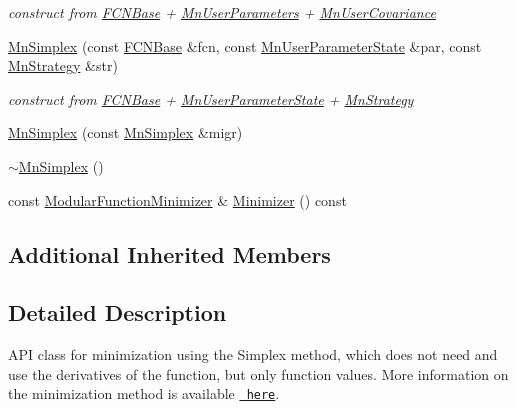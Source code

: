 \begin{DoxyCompactItemize}
\begin{DoxyCompactList}\small\item\em construct from \mbox{\hyperlink{classROOT_1_1Minuit2_1_1FCNBase}{F\+C\+N\+Base}} + \mbox{\hyperlink{classROOT_1_1Minuit2_1_1MnUserParameters}{Mn\+User\+Parameters}} + \mbox{\hyperlink{classROOT_1_1Minuit2_1_1MnUserCovariance}{Mn\+User\+Covariance}} \end{DoxyCompactList}\item 
\mbox{\hyperlink{classROOT_1_1Minuit2_1_1MnSimplex_a3dc51e6d9719501f7fce44a66444c6d2}{Mn\+Simplex}} (const \mbox{\hyperlink{classROOT_1_1Minuit2_1_1FCNBase}{F\+C\+N\+Base}} \&fcn, const \mbox{\hyperlink{classROOT_1_1Minuit2_1_1MnUserParameterState}{Mn\+User\+Parameter\+State}} \&par, const \mbox{\hyperlink{classROOT_1_1Minuit2_1_1MnStrategy}{Mn\+Strategy}} \&str)
\begin{DoxyCompactList}\small\item\em construct from \mbox{\hyperlink{classROOT_1_1Minuit2_1_1FCNBase}{F\+C\+N\+Base}} + \mbox{\hyperlink{classROOT_1_1Minuit2_1_1MnUserParameterState}{Mn\+User\+Parameter\+State}} + \mbox{\hyperlink{classROOT_1_1Minuit2_1_1MnStrategy}{Mn\+Strategy}} \end{DoxyCompactList}\item 
\mbox{\hyperlink{classROOT_1_1Minuit2_1_1MnSimplex_a47aec4c766dc559a1a1e1fe7809d0a88}{Mn\+Simplex}} (const \mbox{\hyperlink{classROOT_1_1Minuit2_1_1MnSimplex}{Mn\+Simplex}} \&migr)
\item 
\mbox{\hyperlink{classROOT_1_1Minuit2_1_1MnSimplex_a0cab2c1cf29e82fdd340eb78e0cd7ff2}{$\sim$\+Mn\+Simplex}} ()
\item 
const \mbox{\hyperlink{classROOT_1_1Minuit2_1_1ModularFunctionMinimizer}{Modular\+Function\+Minimizer}} \& \mbox{\hyperlink{classROOT_1_1Minuit2_1_1MnSimplex_a8fa3495353e667d85e7dbeaffa94b94c}{Minimizer}} () const
\end{DoxyCompactItemize}
\subsection*{Additional Inherited Members}


\subsection{Detailed Description}
A\+PI class for minimization using the Simplex method, which does not need and use the derivatives of the function, but only function values. More information on the minimization method is available \href{http://seal.web.cern.ch/mathlibs/documents/minuit/mntutorial.pdf}{\texttt{ here}}.

